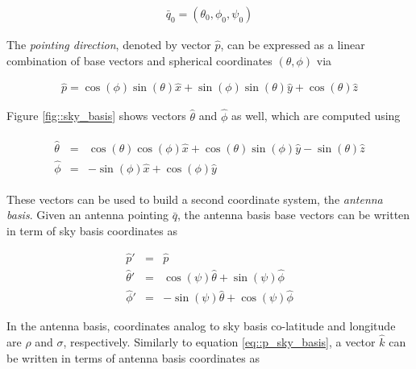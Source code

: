 \documentclass[a4paper,fleqn]{cas-dc}\sloppy
\begin{document}
	\begin{equation}
	\begin{aligned}
	\bar{q}_0= (\theta_0,\phi_0,\psi_0)
	\end{aligned}
	\end{equation}
	
	The \textsl{pointing direction}, denoted by vector $\hat{p}$, can be expressed as a linear combination of base vectors and spherical coordinates $(\theta,\phi)$ via
	
	\begin{equation}
	\begin{aligned}
	\hat{p} = \cos(\phi)\sin(\theta)\hat{x} + \sin(\phi)\sin(\theta) \hat{y} + \cos(\theta) \hat{z}
	\end{aligned}
	\label{eq::p_sky_basis}
	\end{equation}
	
	Figure \ref{fig::sky_basis} shows vectors $\hat{\theta}$ and $\hat{\phi}$ as well, which are computed using
	
	\begin{eqnarray}
	\begin{aligned}
	\hat{\theta} &=&  \cos(\theta) \cos(\phi) \hat{x} + \cos(\theta)\sin(\phi) \hat{y} - \sin(\theta) \hat{z} \\
	\hat{\phi}   &=&              -\sin(\phi) \hat{x} +             \cos(\phi) \hat{y}
	\end{aligned}
	\label{eq::tangent_sky_basis}
	\end{eqnarray}
	
	These vectors can be used to build a second coordinate system, the \textsl{antenna basis}. Given an antenna pointing $\bar{q}$, the antenna basis base vectors can be written in term of sky basis coordinates as 
	
	\begin{eqnarray}
	\hat{p}'      &=&  \hat{p} \\
	\hat{\theta}' &=&  \cos(\psi)\hat{\theta} + \sin(\psi)\hat{\phi} \\
	\hat{\phi}'   &=& -\sin(\psi)\hat{\theta} + \cos(\psi)\hat{\phi}
	\label{eq::antenna_base_vectors}
	\end{eqnarray}
	
	In the antenna basis, coordinates analog to sky basis co-latitude and longitude are $\rho$ and $\sigma$, respectively. Similarly to equation \ref{eq::p_sky_basis}, a vector $\hat{k}$ can be written in terms of antenna basis coordinates as
	
\end{document}
